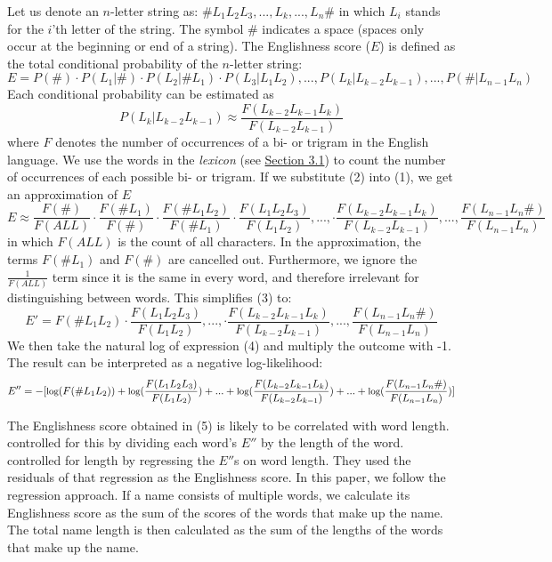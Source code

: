 \documentclass[11pt]{article}
\begin{document}
Let us denote an $n$-letter string as: $\#L_1L_2L_3,...,L_k,...,L_n\#$ in which $L_i$ stands for the $i$'th letter of the string. The symbol $\#$ indicates a space (spaces only occur at the beginning or end of a string). The Englishness score ($E$) is defined as the total conditional probability of the $n$-letter string:
\begin{equation}
    E = P(\#) \cdot P(L_1|\#) \cdot P(L_2|\#L_1) \cdot P(L_3|L_1L_2), ..., P(L_k|L_{k-2}L_{k-1}) , ..., P(\#|L_{n-1}L_{n})
\end{equation}
Each conditional probability can be estimated as
\begin{equation}
    P(L_k|L_{k-2}L_{k-1}) \approx \frac{F(L_{k-2}L_{k-1}L_k)}{F(L_{k-2}L_{k-1})}
\end{equation}
where $F$ denotes the number of occurrences of a bi- or trigram in the English language. We use the words in the \textit{lexicon} (see \hyperref[Lexicon]{Section 3.1}) to count the number of occurrences of each possible bi- or trigram.
If we substitute (2) into (1), we get an approximation of $E$
\begin{equation}
    E \approx \frac{F(\#)}{F(ALL)} \cdot \frac{F(\#L_1)}{F(\#)} \cdot \frac{F(\#L_1L_2)}{F(\#L_1)} \cdot \frac{F(L_1L_2L_3)}{F(L_1L_2)},..., \cdot \frac{F(L_{k-2}L_{k-1}L_k)}{F(L_{k-2}L_{k-1})}, ..., \frac{F(L_{n-1}L_n\#)}{F(L_{n-1}L_{n})}
\end{equation}
in which $F(ALL)$ is the count of all characters.
In the approximation, the terms $F(\#L_1)$ and $F(\#)$ are cancelled out. Furthermore, we ignore the $\frac{1}{F(ALL)}$ term since it is the same in every word, and therefore irrelevant for distinguishing between words. This simplifies (3) to:
\begin{equation}
    E' = F(\#L_1L_2) \cdot \frac{F(L_1L_2L_3)}{F(L_1L_2)},..., \cdot \frac{F(L_{k-2}L_{k-1}L_k)}{F(L_{k-2}L_{k-1})}, ..., \frac{F(L_{n-1}L_n\#)}{F(L_{n-1}L_{n})}
\end{equation}
We then take the natural log of expression (4) and multiply the outcome with -1. The result can be interpreted as a negative log-likelihood:
\begin{equation}\small
    E'' = - [ \text{log}(F(\#L_1L_2)) + \text{log}(\frac{F(L_1L_2L_3)}{F(L_1L_2)}) + ... + \text{log}(\frac{F(L_{k-2}L_{k-1}L_k)}{F(L_{k-2}L_{k-1})}) + ... + 
    \text{log}(\frac{F(L_{n-1}L_n\#)}{F(L_{n-1}L_{n})})]
\end{equation}

The Englishness score obtained in (5) is likely to be correlated with word length. \cite{travers1978pronounceability} controlled for this by dividing each word's $E''$ by the length of the word. \cite{green2013company} controlled for length by regressing the $E''$s on word length. They used the residuals of that regression as the Englishness score. In this paper, we follow the regression approach. If a name consists of multiple words, we calculate its Englishness score as the sum of the scores of the words that make up the name. The total name length is then calculated as the sum of the lengths of the words that make up the name.
\end{document}
